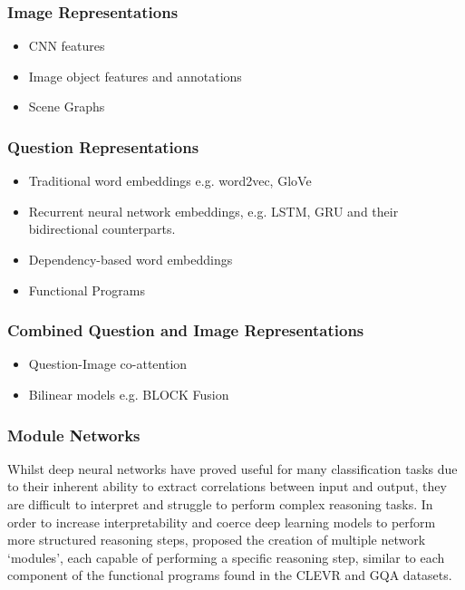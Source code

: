 \subsubsection*{Image Representations}

\begin{itemize}
    \item CNN features
    \item Image object features and annotations
    \item Scene Graphs
\end{itemize}

\subsubsection*{Question Representations}

\begin{itemize}
    \item Traditional word embeddings e.g. word2vec, GloVe
    \item Recurrent neural network embeddings, e.g. LSTM, GRU and their bidirectional counterparts. 
    \item Dependency-based word embeddings \cite{levy2014dependency}
    \item Functional Programs
\end{itemize}

\subsubsection*{Combined Question and Image Representations}

\begin{itemize}
    \item Question-Image co-attention \cite{lu2016hierarchical}
    \item Bilinear models e.g. BLOCK Fusion \cite{ben2019block}
\end{itemize}


\subsubsection*{Module Networks}

Whilst deep neural networks have proved useful for many classification tasks due to their inherent ability to extract correlations between input and output, they are difficult to interpret and struggle to perform complex reasoning tasks. In order to increase interpretability and coerce deep learning models to perform more structured reasoning steps, \citeauthor{andreas2016neural} proposed the creation of multiple network `modules', each capable of performing a specific reasoning step, similar to each component of the functional programs found in the CLEVR \cite{johnson2017clevr} and GQA \cite{hudson2019gqa} datasets.

